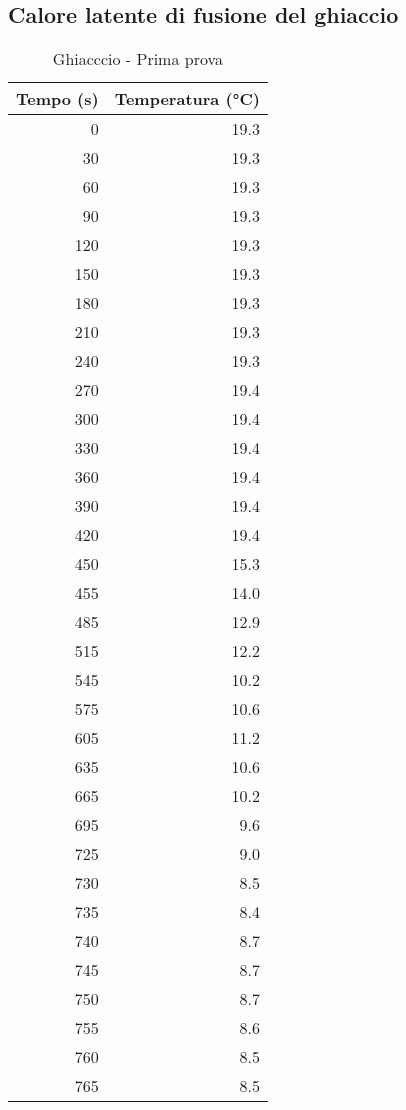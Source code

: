 \documentclass[10pt,twocolumn]{article}
\begin{document}
\subsection{Calore latente di fusione del ghiaccio}
\begin{table}[H]
\footnotesize 
\begin{minipage}{.45\textwidth}
\footnotesize
\centering
\centering
\caption*{Ghiacccio - Prima prova} 
\label{tab:temp5}
\begin{tabular}{|r|r|}
\hline
Tempo (s) & Temperatura (°C) \\
\hline
0 & 19.3 \\ \hline
30 & 19.3 \\ \hline
60 & 19.3 \\ \hline
90 & 19.3 \\ \hline
120 & 19.3 \\ \hline
150 & 19.3 \\ \hline
180 & 19.3 \\ \hline
210 & 19.3 \\ \hline
240 & 19.3 \\ \hline
270 & 19.4 \\ \hline
300 & 19.4 \\ \hline
330 & 19.4 \\ \hline
360 & 19.4 \\ \hline
390 & 19.4 \\ \hline
420 & 19.4 \\ \hline
450 & 15.3 \\ \hline
455 & 14.0 \\ \hline
485 & 12.9 \\ \hline
515 & 12.2 \\ \hline
545 & 10.2 \\ \hline
575 & 10.6 \\ \hline
605 & 11.2 \\ \hline
635 & 10.6 \\ \hline
665 & 10.2 \\ \hline
695 & 9.6 \\ \hline
725 & 9.0 \\ \hline
730 & 8.5 \\ \hline
735 & 8.4 \\ \hline
740 & 8.7 \\ \hline
745 & 8.7 \\ \hline
750 & 8.7 \\ \hline
755 & 8.6 \\ \hline
760 & 8.5 \\ \hline
765 & 8.5 \\ \hline

\end{tabular}
\end{minipage}
\end{table}
\end{document}
